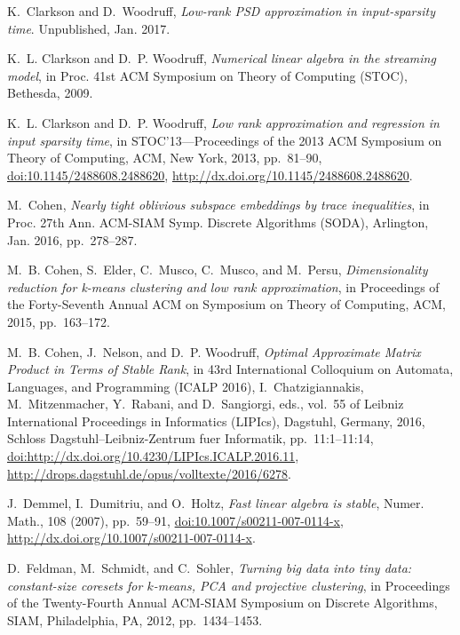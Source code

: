 \documentclass[final]{siamart1116}
\numberwithin{equation}{section}
\numberwithin{theorem}{section}
\numberwithin{figure}{section}
\begin{document}
\begin{thebibliography}{10}
{\sc K.~Clarkson and D.~Woodruff}, {\em Low-rank {PSD} approximation in
  input-sparsity time}.
\newblock Unpublished, Jan. 2017.

{\sc K.~L. Clarkson and D.~P. Woodruff}, {\em Numerical linear algebra in the
  streaming model}, in Proc. 41st ACM Symposium on Theory of Computing (STOC),
  Bethesda, 2009.

{\sc K.~L. Clarkson and D.~P. Woodruff}, {\em Low rank approximation and
  regression in input sparsity time}, in S{TOC}'13---{P}roceedings of the 2013
  {ACM} {S}ymposium on {T}heory of {C}omputing, ACM, New York, 2013,
  pp.~81--90, \href{http://dx.doi.org/10.1145/2488608.2488620}
  {doi:10.1145/2488608.2488620},
  \url{http://dx.doi.org/10.1145/2488608.2488620}.

{\sc M.~Cohen}, {\em Nearly tight oblivious subspace embeddings by trace
  inequalities}, in Proc. 27th Ann. ACM-SIAM Symp. Discrete Algorithms (SODA),
  Arlington, Jan. 2016, pp.~278--287.

{\sc M.~B. Cohen, S.~Elder, C.~Musco, C.~Musco, and M.~Persu}, {\em
  Dimensionality reduction for k-means clustering and low rank approximation},
  in Proceedings of the Forty-Seventh Annual ACM on Symposium on Theory of
  Computing, ACM, 2015, pp.~163--172.

{\sc M.~B. Cohen, J.~Nelson, and D.~P. Woodruff}, {\em {Optimal Approximate
  Matrix Product in Terms of Stable Rank}}, in 43rd International Colloquium on
  Automata, Languages, and Programming (ICALP 2016), I.~Chatzigiannakis,
  M.~Mitzenmacher, Y.~Rabani, and D.~Sangiorgi, eds., vol.~55 of Leibniz
  International Proceedings in Informatics (LIPIcs), Dagstuhl, Germany, 2016,
  Schloss Dagstuhl--Leibniz-Zentrum fuer Informatik, pp.~11:1--11:14,
  \href{http://dx.doi.org/http://dx.doi.org/10.4230/LIPIcs.ICALP.2016.11}
  {doi:http://dx.doi.org/10.4230/LIPIcs.ICALP.2016.11},
  \url{http://drops.dagstuhl.de/opus/volltexte/2016/6278}.

{\sc J.~Demmel, I.~Dumitriu, and O.~Holtz}, {\em Fast linear algebra is
  stable}, Numer. Math., 108 (2007), pp.~59--91,
  \href{http://dx.doi.org/10.1007/s00211-007-0114-x}
  {doi:10.1007/s00211-007-0114-x},
  \url{http://dx.doi.org/10.1007/s00211-007-0114-x}.

{\sc D.~Feldman, M.~Schmidt, and C.~Sohler}, {\em Turning big data into tiny
  data: constant-size coresets for {$k$}-means, {PCA} and projective
  clustering}, in Proceedings of the {T}wenty-{F}ourth {A}nnual {ACM}-{SIAM}
  {S}ymposium on {D}iscrete {A}lgorithms, SIAM, Philadelphia, PA, 2012,
  pp.~1434--1453.


\end{thebibliography}
\end{document}
